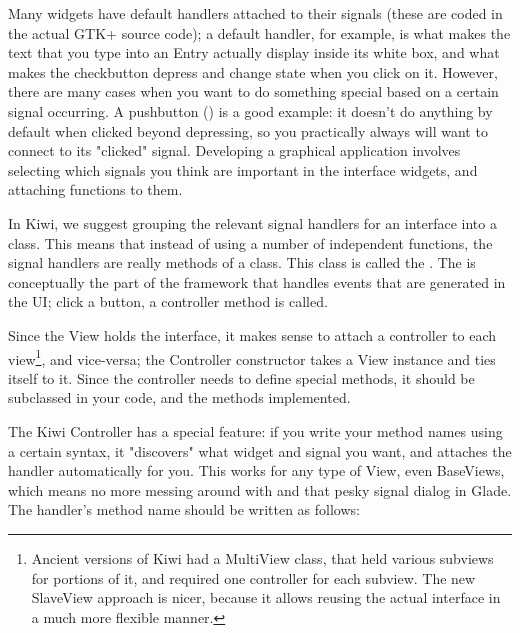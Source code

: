 \documentclass[a4paper]{howto}
\begin{document}
Many widgets have default handlers attached to their signals (these are
coded in the actual GTK+ source code); a default handler, for example,
is what makes the text that you type into an Entry actually display
inside its white box, and what makes the checkbutton depress and change
state when you click on it. However, there are many cases when you want
to do something special based on a certain signal occurring. A pushbutton
() is a good example: it doesn't do anything by default
when clicked beyond depressing, so you practically always will want to
connect to its "clicked" signal. Developing a graphical application
involves selecting which signals you think are important in the
interface widgets, and attaching functions to them.

In Kiwi, we suggest grouping the relevant signal handlers for an
interface into a class. This means that instead of using a number of
independent functions, the signal handlers are really methods of
a class. This class is called the . The
 is conceptually the part of the framework that
handles events that are generated in the UI; click a button, a
controller method is called.

Since the View holds the interface, it makes sense to attach a
controller to each view\footnote{Ancient versions of Kiwi had a
MultiView class, that held various subviews for portions of it, and
required one controller for each subview. The new SlaveView approach is
nicer, because it allows reusing the actual interface in a much more
flexible manner.}, and vice-versa; the Controller constructor takes a
View instance and ties itself to it. Since the controller needs to
define special methods, it should be subclassed in your code, and the
methods implemented.

The Kiwi Controller has a special feature: if you write your method
names using a certain syntax, it "discovers" what widget and signal you
want, and attaches the handler automatically for you. This works for any
type of View, even BaseViews, which means no more messing around with
 and that pesky signal dialog in Glade. The
handler's method name should be written as follows:
\end{document}
